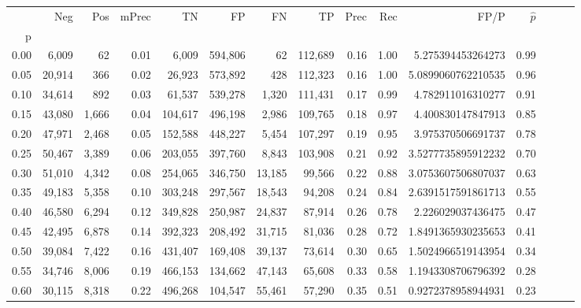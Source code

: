 \begin{tabular}{rrrrrrrrrrrrrrr}
\toprule
{} &     Neg &    Pos & mPrec &       TN &       FP &       FN &       TP &  Prec &   Rec &                 FP/P & $\hat{p}$ \\
p    &         &        &       &          &          &          &          &       &       &                      &           \\
\midrule
0.00 &   6,009 &     62 &  0.01 &    6,009 &  594,806 &       62 &  112,689 &  0.16 &  1.00 &    5.275394453264273 &      0.99 \\
0.05 &  20,914 &    366 &  0.02 &   26,923 &  573,892 &      428 &  112,323 &  0.16 &  1.00 &   5.0899060762210535 &      0.96 \\
0.10 &  34,614 &    892 &  0.03 &   61,537 &  539,278 &    1,320 &  111,431 &  0.17 &  0.99 &    4.782911016310277 &      0.91 \\
0.15 &  43,080 &  1,666 &  0.04 &  104,617 &  496,198 &    2,986 &  109,765 &  0.18 &  0.97 &    4.400830147847913 &      0.85 \\
0.20 &  47,971 &  2,468 &  0.05 &  152,588 &  448,227 &    5,454 &  107,297 &  0.19 &  0.95 &    3.975370506691737 &      0.78 \\
0.25 &  50,467 &  3,389 &  0.06 &  203,055 &  397,760 &    8,843 &  103,908 &  0.21 &  0.92 &   3.5277735895912232 &      0.70 \\
0.30 &  51,010 &  4,342 &  0.08 &  254,065 &  346,750 &   13,185 &   99,566 &  0.22 &  0.88 &   3.0753607506807037 &      0.63 \\
0.35 &  49,183 &  5,358 &  0.10 &  303,248 &  297,567 &   18,543 &   94,208 &  0.24 &  0.84 &   2.6391517591861713 &      0.55 \\
0.40 &  46,580 &  6,294 &  0.12 &  349,828 &  250,987 &   24,837 &   87,914 &  0.26 &  0.78 &    2.226029037436475 &      0.47 \\
0.45 &  42,495 &  6,878 &  0.14 &  392,323 &  208,492 &   31,715 &   81,036 &  0.28 &  0.72 &   1.8491365930235653 &      0.41 \\
0.50 &  39,084 &  7,422 &  0.16 &  431,407 &  169,408 &   39,137 &   73,614 &  0.30 &  0.65 &   1.5024966519143954 &      0.34 \\
0.55 &  34,746 &  8,006 &  0.19 &  466,153 &  134,662 &   47,143 &   65,608 &  0.33 &  0.58 &   1.1943308706796392 &      0.28 \\
0.60 &  30,115 &  8,318 &  0.22 &  496,268 &  104,547 &   55,461 &   57,290 &  0.35 &  0.51 &   0.9272378958944931 &      0.23 \\

\end{tabular}
